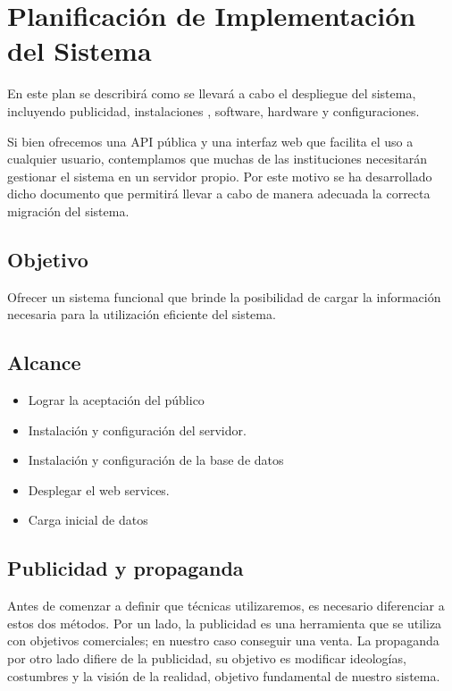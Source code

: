 \documentclass[a4paper,12pt]{article}
\begin{document}


\section{Planificación de Implementación del Sistema}
En este plan se describirá como se llevará a cabo el despliegue del sistema, incluyendo publicidad, instalaciones , software, hardware y configuraciones.

Si bien ofrecemos una API pública y una interfaz web que facilita el uso a cualquier usuario, contemplamos que muchas de las instituciones necesitarán gestionar el sistema en un servidor propio. Por este motivo se ha desarrollado dicho documento que permitirá llevar a cabo de manera adecuada la correcta migración del sistema.

\subsection{Objetivo}


Ofrecer un sistema funcional que brinde la posibilidad de cargar la información necesaria para la utilización eficiente del sistema.
\subsection{Alcance}
\begin{itemize}
	\item Lograr la aceptación del público
	\item Instalación y configuración del servidor.
	\item Instalación y configuración de la base de datos
	\item Desplegar el web services.
	\item Carga inicial de datos
\end{itemize}

\subsection{Publicidad y propaganda}

Antes de comenzar a definir que técnicas utilizaremos, es necesario diferenciar a estos dos métodos. Por un lado, la publicidad es una herramienta que se utiliza con objetivos comerciales; en nuestro caso conseguir una venta. La propaganda por otro lado difiere de la publicidad, su objetivo es modificar ideologías, costumbres y la visión de la realidad, objetivo fundamental de nuestro sistema.
\end{document}
